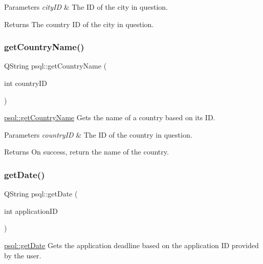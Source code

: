 \begin{DoxyParams}{Parameters}
{\em city\+ID} & The ID of the city in question. \\
\hline
\end{DoxyParams}
\begin{DoxyReturn}{Returns}
The country ID of the city in question. 
\end{DoxyReturn}
\mbox{\label{classpsql_a5724e9992e6a5c98524ab73b98f4202d}} 
\subsubsection{\texorpdfstring{get\+Country\+Name()}{getCountryName()}}
{\footnotesize\ttfamily Q\+String psql\+::get\+Country\+Name (\begin{DoxyParamCaption}\item[{int}]{country\+ID }\end{DoxyParamCaption})}



\hyperlink{classpsql_a5724e9992e6a5c98524ab73b98f4202d}{psql\+::get\+Country\+Name} Gets the name of a country based on its ID. 


\begin{DoxyParams}{Parameters}
{\em country\+ID} & The ID of the country in question. \\
\hline
\end{DoxyParams}
\begin{DoxyReturn}{Returns}
On success, return the name of the country. 
\end{DoxyReturn}
\mbox{\label{classpsql_a561f96bfe7e9d092077712dd6b186af8}} 
\subsubsection{\texorpdfstring{get\+Date()}{getDate()}}
{\footnotesize\ttfamily Q\+String psql\+::get\+Date (\begin{DoxyParamCaption}\item[{int}]{application\+ID }\end{DoxyParamCaption})}



\hyperlink{classpsql_a561f96bfe7e9d092077712dd6b186af8}{psql\+::get\+Date} Gets the application deadline based on the application ID provided by the user. 


